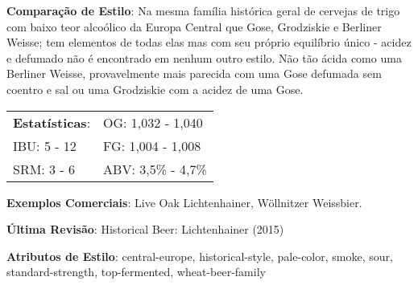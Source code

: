 \textbf{Comparação de Estilo}: Na mesma família histórica geral de cervejas de trigo com baixo teor alcoólico da Europa Central que Gose, Grodziskie e Berliner Weisse; tem elementos de todas elas mas com seu próprio equilíbrio único - acidez e defumado não é encontrado em nenhum outro estilo. Não tão ácida como uma Berliner Weisse, provavelmente mais parecida com uma Gose defumada sem coentro e sal ou uma Grodziskie com a acidez de uma Gose.

\begin{tabular}{@{}p{35mm}p{35mm}@{}}
  \textbf{Estatísticas}: & OG: 1,032 - 1,040  \\
  IBU: 5 - 12  & FG: 1,004 - 1,008  \\
  SRM: 3 - 6 & ABV: 3,5\% - 4,7\%
\end{tabular}

\textbf{Exemplos Comerciais}: Live Oak Lichtenhainer, Wöllnitzer Weissbier.

\textbf{Última Revisão}: Historical Beer: Lichtenhainer (2015)

\textbf{Atributos de Estilo}: central-europe, historical-style, pale-color, smoke, sour, standard-strength, top-fermented, wheat-beer-family
